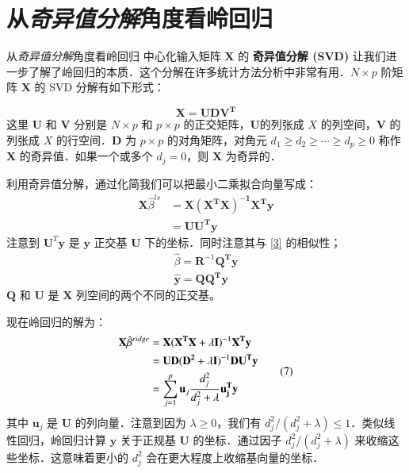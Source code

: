 \documentclass[
  15pt,
  ignorenonframetext,
]{beamer}
\begin{document}
\hypertarget{ux4eceux5947ux5f02ux503cux5206ux89e3ux89d2ux5ea6ux770bux5cadux56deux5f52}{%
\section{\texorpdfstring{从\emph{奇异值分解}角度看岭回归}{从奇异值分解角度看岭回归}}\label{ux4eceux5947ux5f02ux503cux5206ux89e3ux89d2ux5ea6ux770bux5cadux56deux5f52}}

\begin{frame}{从\emph{奇异值分解}角度看岭回归}
中心化输入矩阵 \(\mathbf{X}\) 的 \textbf{奇异值分解 (SVD)}
让我们进一步了解了岭回归的本质．这个分解在许多统计方法分析中非常有用．\(N\times p\)
阶矩阵 \(\mathbf{X}\) 的 SVD 分解有如下形式：

\[\mathbf{X=UDV^T}
\tag{5}
\label{5}
\] 这里 \(\mathbf{U}\) 和 \(\mathbf{V}\) 分别是 \(N\times p\) 和
\(p\times p\) 的正交矩阵，\(\mathbf{U}\)的列张成 \(X\)
的列空间，\(\mathbf{V}\) 的列张成 \(X\) 的行空间．\(\mathbf{D}\) 为
\(p\times p\) 的对角矩阵，对角元 \(d_1\ge d_2 \ge \cdots \ge d_p \ge 0\)
称作 \(\mathbf{X}\) 的奇异值．如果一个或多个 \(d_j=0\)，则
\(\mathbf{X}\) 为奇异的．
\end{frame}

\begin{frame}
利用奇异值分解，通过化简我们可以把最小二乘拟合向量写成：
\[\begin{aligned}
\mathbf{X} \hat{\beta}^{l s} &=\mathbf{X}\left(\mathbf{X}^{\mathbf{T}} \mathbf{X}\right)^{-\mathbf{1}} \mathbf{X}^{\mathbf{T}} \mathbf{y} \\
&=\mathbf{U U}^{\mathbf{T}} \mathbf{y}
\end{aligned}\] 注意到 \(\mathbf{U}^T\mathbf y\) 是 \(\mathbf{y}\)
正交基 \(\mathbf{U}\) 下的坐标．同时注意其与 \eqref{3} 的相似性； \[
\begin{array}{l}
\hat{\beta}=\mathbf{R}^{-1} \mathbf{Q}^{\mathbf{T}} \mathbf{y} \\
\hat{\mathbf{y}}=\mathbf{Q Q}^{\mathbf{T}} \mathbf{y}
\end{array}
\] \(\mathbf{Q}\) 和 \(\mathbf{U}\) 是 \(\mathbf{X}\)
列空间的两个不同的正交基。
\end{frame}

\begin{frame}
现在岭回归的解为： \[\begin{aligned}
\mathbf{X}\hat{\beta}^{ridge}&=\mathbf{X}(\mathbf{X^TX}+\lambda \mathbf{I})^{-1}\mathbf{X^Ty}\notag\\
&= \mathbf{UD}(\mathbf{D^2}+\lambda \mathbf{I})^{-1}\mathbf{DU^Ty}\notag\\
&= \sum\limits_{j=1}^p\mathbf{u}_j\dfrac{d_j^2}{d_j^2+\lambda}\mathbf{u_j^Ty}
\end{aligned}
\tag{7}
\] 其中 \(\mathbf{u}_j\) 是 \(\mathbf{U}\) 的列向量．注意到因为
\(\lambda \ge 0\)，我们有
\(d_j^2/(d^2_j+\lambda)\le 1\)．类似线性回归，岭回归计算 \(\mathbf{y}\)
关于正规基 \(\mathbf{U}\) 的坐标．通过因子 \(d^2_j/(d^2_j+\lambda)\)
来收缩这些坐标．这意味着更小的 \(d_j^2\)
会在更大程度上收缩基向量的坐标．
\end{frame}
\end{document}
